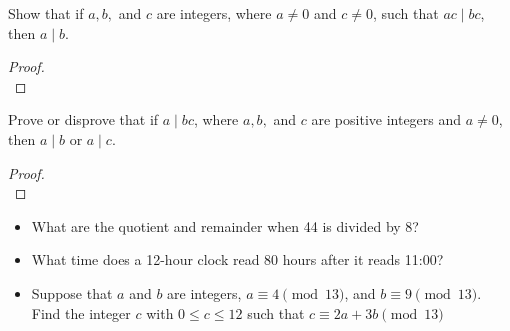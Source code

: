 \begin{exmp}

Show that if \(a, b,\) and \(c\) are integers, where \(a \neq 0\) and \(c \neq 0\), such that \(ac \mid bc\), then \(a \mid b\).

\begin{proof}$ $\\

\vspace{2cm}
\end{proof}
\end{exmp}
\begin{exmp}

Prove or disprove that if \(a \mid bc\), where \(a, b,\) and \(c\) are positive integers and \(a \neq 0\), then \(a \mid b\) or \(a \mid c\).


\begin{proof}$ $\\

\vspace{2cm}
\end{proof}
\end{exmp}
\begin{exmp}
\begin{itemize} $ $\\
\item What are the quotient and remainder when 44 is divided by 8?
\item What time does a 12-hour clock read 80 hours after it reads 11:00?
\item Suppose that \(a\) and \(b\) are integers, \(a \equiv 4 \pmod{13}\), and \(b \equiv 9 \pmod{13}\). Find the integer \(c\) with \(0 \leq c \leq 12\) such that
\(c \equiv 2a + 3b \pmod{13}\)
\end{itemize}

\end{exmp}
\newpage
